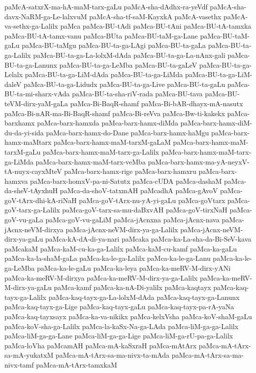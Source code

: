 {paMcA-satxrX-ma-hA-maM-tarx-gaLu
paMcA-sha-dAdhx-ra-yeVdf
paMcA-sha-davx-NaRM-ga-Le-lalxvuM
paMcA-sha-tf-saM-KayxkA
paMcA-vasethx
paMcA-va-sethx-ga-Lalilx
paMca
paMca-BU-tAdi
paMca-BU-tAni
paMca-BU-tA-tamxka
paMca-BU-tA-tamx-vanu
paMca-BUta
paMca-BU-taM-ga-Lane
paMca-BU-taM-gaLu
paMca-BU-taMgu
paMca-BU-ta-ga-LAgi
paMca-BU-ta-gaLa
paMca-BU-ta-ga-Lalilx
paMca-BU-ta-ga-La-lolxM-dAda
paMca-BU-ta-ga-La-nAnx-gali
paMca-BU-ta-ga-Lanunx
paMca-BU-ta-ga-LeMba
paMca-BU-ta-gaLeV
paMca-BU-ta-ga-Lelalx
paMca-BU-ta-ga-LiM-dAda
paMca-BU-ta-ga-LiMda
paMca-BU-ta-ga-LiM-daleV
paMca-BU-ta-ga-Lidudx
paMca-BU-ta-ga-Live
paMca-BU-ta-gaLu
paMca-BU-ta-mi-sharx-vAda
paMca-BU-ta-sha-riV-rada
paMca-BU-tava
paMca-BU-teVM-dirx-yaM-gaLa
paMca-Bi-BaqR-shamf
paMca-Bi-bAR-dhayx-mA-nasutx
paMca-Bi-nAR-ma-Bi-BaqR-shamf
paMca-Bi-reVva
paMca-Bw-ti-kakekx
paMca-barxhamx
paMca-barx-hamxda
paMca-barx-hamx-diMda
paMca-barx-hamx-diM-du-da-yi-sida
paMca-barx-hamx-do-Dane
paMca-barx-hamx-haMgu
paMca-barx-hamx-maMtarx
paMca-barx-hamx-maM-tarxM-gaLaM
paMca-barx-hamx-maM-tarxM-gaLu
paMca-barx-hamx-maM-tarx-ga-Lalilx
paMca-barx-hamx-maM-tarx-ga-LiMda
paMca-barx-hamx-maM-tarx-veMba
paMca-barx-hamx-ma-yA-neyxV-tA-nuyx-cayxMteV
paMca-barx-hamx-rige
paMca-barx-hamxru
paMca-barx-hamxva
paMca-barx-homxV-pa-ni-Satutx
paMca-cUDA
paMca-dashaM
paMca-da-sheV-tAyxhuH
paMca-da-shoV-tatxmAH
paMcadhA
paMca-gAvoV
paMca-goV-tArx-dhi-kA-riNaH
paMca-goV-tArx-nu-yA-yi-gaLu
paMca-goVtarx
paMca-goV-tarx-ga-Lalilx
paMca-goV-tarx-sa-mu-daBxvAH
paMca-goV-tirxNaH
paMca-goV-vu-gaLa
paMca-goV-vu-gaLiM
paMca-jAcnxna
paMca-jAcnx-nava
paMca-jAcnx-neVM-dirxya
paMca-jAcnx-neVM-dirx-ya-ga-Lalilx
paMca-jAcnx-neVM-dirx-ya-gaLu
paMca-kA-dA-di-ya-nari
paMcaka
paMca-ka-La-sha-da-Bi-SeV-kava
paMcakaM
paMca-kaM-cu-ka-ga-Lalilx
paMca-kaM-cu-kamf
paMca-ka-gaLu
paMca-ka-la-shaM-gaLa
paMca-ka-le-ga-Lalilx
paMca-ka-le-ga-Lanu
paMca-ka-le-ga-LeMba
paMca-ka-le-gaLu
paMca-ka-leya
paMca-ka-meRV-M-dirx-yANi
paMca-ka-meRV-M-dirxya
paMca-ka-meRV-M-dirx-ya-ga-Lalilx
paMca-ka-meRV-M-dirx-ya-gaLu
paMca-kamf
paMca-ka-nA-Di-yalilx
paMca-kaqtayx
paMca-kaq-tayx-ga-Lalilx
paMca-kaq-tayx-ga-La-lolxM-dAda
paMca-kaq-tayx-ga-Lanunx
paMca-kaq-tayx-ga-Lige
paMca-kaq-tayx-gaLu
paMca-kaq-tayx-pa-rA-yaNa
paMca-kaq-tayxsayx
paMca-ka-va-nikikx
paMca-kelxVsha
paMca-koV-shaM-gaLu
paMca-koV-sha-ga-Lalilx
paMca-la-kaSx-Na-ga-LAda
paMca-liM-ga-ga-Lalilx
paMca-liM-ga-ga-Lane
paMca-liM-ga-ga-Lige
paMca-liM-ga-rU-pa-ga-Lalilx
paMca-loVha
paMcamAH
paMca-mA-kaSxraH
paMca-mAtArx
paMca-mA-tArx-sa-mA-yukatxM
paMca-mA-tArx-sa-ma-nivx-ta-mAda
paMca-mA-tArx-sa-ma-nivx-tamf
paMca-mA-tArx-tamxkaM
}
